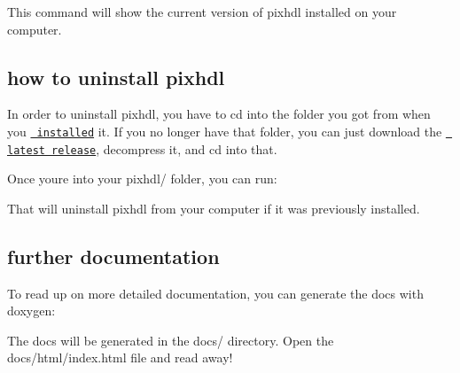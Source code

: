 This command will show the current version of pixhdl installed on your computer.

\subsection*{how to uninstall pixhdl}

In order to uninstall pixhdl, you have to {\ttfamily cd} into the folder you got from when you \href{\#how-to-install-pixhdl}{\texttt{ installed}} it. If you no longer have that folder, you can just download the \href{https://github.com/kokkonisd/pixhdl/releases/latest}{\texttt{ latest release}}, decompress it, and {\ttfamily cd} into that.

Once you\textquotesingle{}re into your {\ttfamily pixhdl/} folder, you can run\+:


\begin{DoxyCode}{0}
\end{DoxyCode}


That will uninstall pixhdl from your computer if it was previously installed.

\subsection*{further documentation}

To read up on more detailed documentation, you can generate the docs with {\ttfamily doxygen}\+:


\begin{DoxyCode}{0}
\end{DoxyCode}


The docs will be generated in the {\ttfamily docs/} directory. Open the {\ttfamily docs/html/index.\+html} file and read away! 